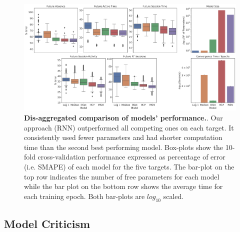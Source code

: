 


\begin{figure}[h]
\centering
\includegraphics[width=.8\textwidth]{images/chapter_3/performance_exploded_32.png}
\caption{\textbf{Dis-aggregated comparison of models' performance.}. Our approach (RNN) outperformed all competing ones on each target. It consistently used fewer parameters and had shorter computation time than the second best performing model. Box-plots show the 10-fold cross-validation performance expressed as percentage of error (i.e. SMAPE) of each model for the five targets. The bar-plot on the top row indicates the number of free parameters for each model while the bar plot on the bottom row shows the average time for each training epoch. Both bar-plots are $log_{10}$ scaled.}
\label{model_comp_non_coll} 
\end{figure}

\subsection{Model Criticism}

